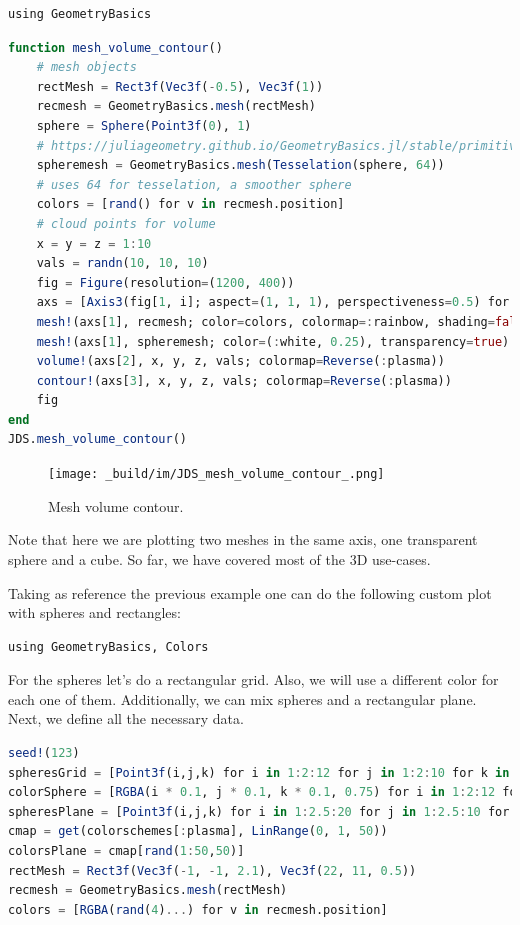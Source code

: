 \documentclass[
  notoc %
]{tufte-book}
\begin{document}
\begin{lstlisting}
using GeometryBasics
\end{lstlisting}

\begin{lstlisting}[language=Julia]
function mesh_volume_contour()
    # mesh objects
    rectMesh = Rect3f(Vec3f(-0.5), Vec3f(1))
    recmesh = GeometryBasics.mesh(rectMesh)
    sphere = Sphere(Point3f(0), 1)
    # https://juliageometry.github.io/GeometryBasics.jl/stable/primitives/
    spheremesh = GeometryBasics.mesh(Tesselation(sphere, 64))
    # uses 64 for tesselation, a smoother sphere
    colors = [rand() for v in recmesh.position]
    # cloud points for volume
    x = y = z = 1:10
    vals = randn(10, 10, 10)
    fig = Figure(resolution=(1200, 400))
    axs = [Axis3(fig[1, i]; aspect=(1, 1, 1), perspectiveness=0.5) for i = 1:3]
    mesh!(axs[1], recmesh; color=colors, colormap=:rainbow, shading=false)
    mesh!(axs[1], spheremesh; color=(:white, 0.25), transparency=true)
    volume!(axs[2], x, y, z, vals; colormap=Reverse(:plasma))
    contour!(axs[3], x, y, z, vals; colormap=Reverse(:plasma))
    fig
end
JDS.mesh_volume_contour()
\end{lstlisting}

\begin{figure}
\hypertarget{fig:mesh_volume_contour}{%
\centering
\texttt{[image: \_build/im/JDS\_mesh\_volume\_contour\_.png]}
\caption{Mesh volume contour.}\label{fig:mesh_volume_contour}
}
\end{figure}

Note that here we are plotting two meshes in the same axis, one
transparent sphere and a cube. So far, we have covered most of the 3D
use-cases.

Taking as reference the previous example one can do the following custom
plot with spheres and rectangles:

\begin{lstlisting}
using GeometryBasics, Colors
\end{lstlisting}

For the spheres let's do a rectangular grid. Also, we will use a
different color for each one of them. Additionally, we can mix spheres
and a rectangular plane. Next, we define all the necessary data.

\begin{lstlisting}[language=Julia]
seed!(123)
spheresGrid = [Point3f(i,j,k) for i in 1:2:12 for j in 1:2:10 for k in 1:2:10]
colorSphere = [RGBA(i * 0.1, j * 0.1, k * 0.1, 0.75) for i in 1:2:12 for j in 1:2:10 for k in 1:2:10]
spheresPlane = [Point3f(i,j,k) for i in 1:2.5:20 for j in 1:2.5:10 for k in 1:2.5:4]
cmap = get(colorschemes[:plasma], LinRange(0, 1, 50))
colorsPlane = cmap[rand(1:50,50)]
rectMesh = Rect3f(Vec3f(-1, -1, 2.1), Vec3f(22, 11, 0.5))
recmesh = GeometryBasics.mesh(rectMesh)
colors = [RGBA(rand(4)...) for v in recmesh.position]
\end{lstlisting}
\end{document}
